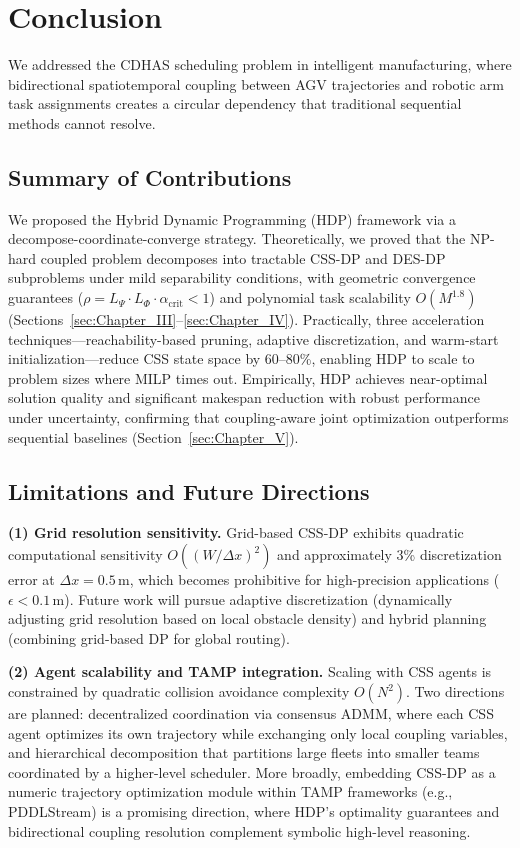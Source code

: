\documentclass[manuscript,screen,review]{acmart}
\begin{document}
\section{Conclusion}
\label{sec:Chapter_VI}

We addressed the CDHAS scheduling problem in intelligent manufacturing,
where bidirectional spatiotemporal coupling between AGV trajectories and
robotic arm task assignments creates a circular dependency that traditional
sequential methods cannot resolve.

\subsection{Summary of Contributions}
\label{sec:contributions}
We proposed the Hybrid Dynamic Programming (HDP) framework via a
decompose-coordinate-converge strategy. Theoretically, we proved that the
NP-hard coupled problem decomposes into tractable CSS-DP and DES-DP
subproblems under mild separability conditions, with geometric convergence
guarantees ($\rho = L_{\Psi} \cdot L_{\Phi} \cdot \alpha_{\text{crit}} < 1$)
and polynomial task scalability $O(M^{1.8})$
(Sections~\ref{sec:Chapter_III}--\ref{sec:Chapter_IV}). Practically, three
acceleration techniques---reachability-based pruning, adaptive discretization,
and warm-start initialization---reduce CSS state space by 60--80\%, enabling
HDP to scale to problem sizes where MILP times out. Empirically, HDP achieves
near-optimal solution quality and significant makespan reduction with robust
performance under uncertainty, confirming that coupling-aware joint
optimization outperforms sequential baselines
(Section~\ref{sec:Chapter_V}).

\subsection{Limitations and Future Directions}
\label{sec:future_work}

\textbf{(1) Grid resolution sensitivity.}
Grid-based CSS-DP exhibits quadratic computational sensitivity
$O((W/\Delta x)^2)$ and approximately 3\% discretization error at
$\Delta x = 0.5$\,m, which becomes prohibitive for high-precision applications
($\epsilon < 0.1$\,m). Future work will pursue adaptive discretization
(dynamically adjusting grid resolution based on local obstacle density) and
hybrid planning (combining grid-based DP for global routing).



\textbf{(2) Agent scalability and TAMP integration.}
Scaling with CSS agents is constrained by quadratic collision avoidance
complexity $O(N^2)$. Two directions are planned: decentralized coordination via consensus
ADMM, where each CSS agent optimizes its own trajectory while exchanging only
local coupling variables, and hierarchical decomposition that partitions large
fleets into smaller teams coordinated by a higher-level scheduler.
More broadly, embedding CSS-DP as a numeric trajectory optimization module
within TAMP frameworks (e.g., PDDLStream) is a promising direction, where HDP's optimality guarantees and bidirectional
coupling resolution complement symbolic high-level reasoning.
\end{document}
